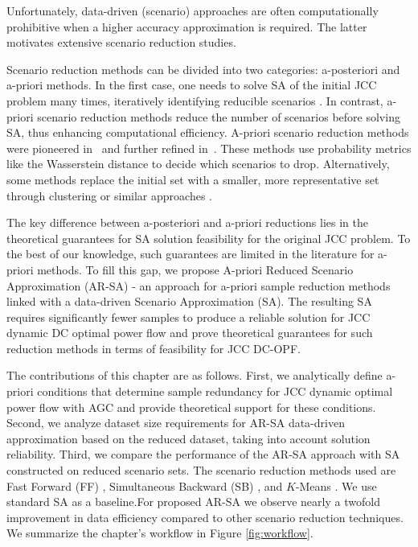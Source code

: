 Unfortunately, data-driven (scenario) approaches are often computationally prohibitive when a higher accuracy approximation is required. The latter motivates extensive scenario reduction studies.

Scenario reduction methods can be divided into two categories: a-posteriori and a-priori methods. In the first case, one needs to solve SA of the initial JCC problem many times, iteratively identifying reducible scenarios \cite{campi2011sampling, geng2019data}. In contrast, a-priori scenario reduction methods reduce the number of scenarios before solving SA, thus enhancing computational efficiency. A-priori scenario reduction methods were pioneered in~\cite{dupavcova2003scenario, dupavcova1990stability} and further refined in~\cite{heitsch2003scenario}. These methods use probability metrics like the Wasserstein distance to decide which scenarios to drop. Alternatively, some methods replace the initial set with a smaller, more representative set through clustering or similar approaches \cite{rujeerapaiboon2022scenario, keutchayan2023problem, liang2020scenario}.


The key difference between a-posteriori and a-priori reductions lies in the theoretical guarantees for SA solution feasibility for the original JCC problem. To the best of our knowledge, such guarantees are limited in the literature for a-priori methods. To fill this gap, we propose A-priori Reduced Scenario Approximation (AR-SA) - an approach for a-priori sample reduction methods linked with a data-driven Scenario Approximation (SA). The resulting SA requires significantly fewer samples to produce a reliable solution for JCC dynamic DC optimal power flow  and prove theoretical guarantees for such reduction methods in terms of feasibility for JCC DC-OPF.

The contributions of this chapter are as follows. First, we analytically define a-priori conditions that determine sample redundancy for JCC dynamic optimal power flow with AGC and provide theoretical support for these conditions. Second, we analyze dataset size requirements for AR-SA data-driven approximation based on the reduced dataset, taking into account solution reliability. Third, we compare the performance of the AR-SA approach with SA constructed on reduced scenario sets. The scenario reduction methods used are Fast Forward (FF) \cite{dupavcova2003scenario}, Simultaneous Backward (SB) \cite{heitsch2003scenario}, and $K$-Means \cite{keutchayan2023problem}. We use standard SA as a baseline.For proposed AR-SA we observe nearly a twofold improvement in data efficiency compared to other scenario reduction techniques. We summarize the chapter's workflow in Figure \ref{fig:workflow}.

